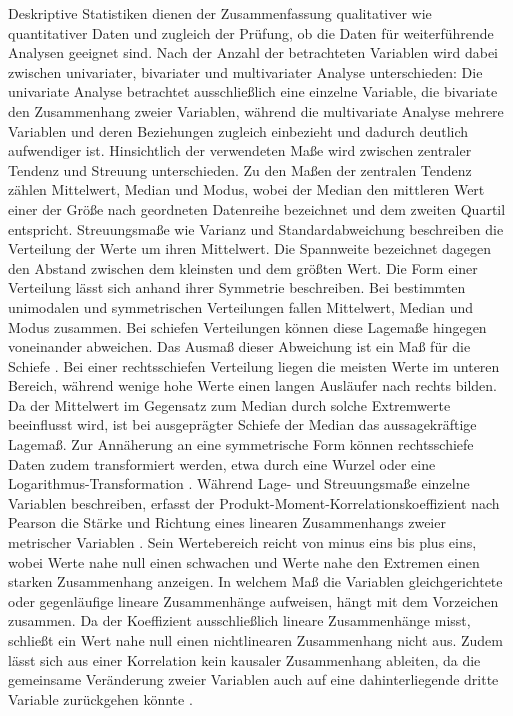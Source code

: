 Deskriptive Statistiken dienen der Zusammenfassung qualitativer wie quantitativer Daten und zugleich der Prüfung, ob die Daten für weiterführende Analysen geeignet sind. Nach der Anzahl der betrachteten Variablen wird dabei zwischen univariater, bivariater und multivariater Analyse unterschieden: Die univariate Analyse betrachtet ausschließlich eine einzelne Variable, die bivariate den Zusammenhang zweier Variablen, während die multivariate Analyse mehrere Variablen und deren Beziehungen zugleich einbezieht und dadurch deutlich aufwendiger ist. Hinsichtlich der verwendeten Maße wird zwischen zentraler Tendenz und Streuung unterschieden. Zu den Maßen der zentralen Tendenz zählen Mittelwert, Median und Modus, wobei der Median den mittleren Wert einer der Größe nach geordneten Datenreihe bezeichnet und dem zweiten Quartil entspricht. Streuungsmaße wie Varianz und Standardabweichung beschreiben die Verteilung der Werte um ihren Mittelwert. Die Spannweite bezeichnet dagegen den Abstand zwischen dem kleinsten und dem größten Wert. Die Form einer Verteilung lässt sich anhand ihrer Symmetrie beschreiben. Bei bestimmten unimodalen und symmetrischen Verteilungen fallen Mittelwert, Median und Modus zusammen. Bei schiefen Verteilungen können diese Lagemaße hingegen voneinander abweichen. Das Ausmaß dieser Abweichung ist ein Maß für die Schiefe \parencite[58]{boslaugh_statistics_2012}. Bei einer rechtsschiefen Verteilung liegen die meisten Werte im unteren Bereich, während wenige hohe Werte einen langen Ausläufer nach rechts bilden. Da der Mittelwert im Gegensatz zum Median durch solche Extremwerte beeinflusst wird, ist bei ausgeprägter Schiefe der Median das aussagekräftige Lagemaß. Zur Annäherung an eine symmetrische Form können rechtsschiefe Daten zudem transformiert werden, etwa durch eine Wurzel oder eine Logarithmus-Transformation \parencite[146]{bornschlegl_towards_2024}. Während Lage- und Streuungsmaße einzelne Variablen beschreiben, erfasst der Produkt-Moment-Korrelationskoeffizient nach Pearson die Stärke und Richtung eines linearen Zusammenhangs zweier metrischer Variablen \parencite[178--189]{boslaugh_statistics_2012}. Sein Wertebereich reicht von minus eins bis plus eins, wobei Werte nahe null einen schwachen und Werte nahe den Extremen einen starken Zusammenhang anzeigen. In welchem Maß die Variablen gleichgerichtete oder gegenläufige lineare Zusammenhänge aufweisen, hängt mit dem Vorzeichen zusammen. Da der Koeffizient ausschließlich lineare Zusammenhänge misst, schließt ein Wert nahe null einen nichtlinearen Zusammenhang nicht aus. Zudem lässt sich aus einer Korrelation kein kausaler Zusammenhang ableiten, da die gemeinsame Veränderung zweier Variablen auch auf eine dahinterliegende dritte Variable zurückgehen könnte \parencite[178--189]{boslaugh_statistics_2012}.

